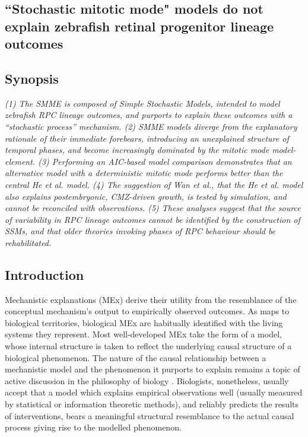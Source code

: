 \documentclass{ut-thesis}
\begin{document}
\begin{NoHyper}
\chapter{``Stochastic mitotic mode" models do not explain zebrafish retinal progenitor lineage outcomes}
\label{chap:SMME}

\section*{Synopsis}
\textit{(1) The SMME is composed of Simple Stochastic Models, intended to model zebrafish RPC lineage outcomes, and purports to explain these outcomes with a ``stochastic process'' mechanism. (2) SMME models diverge from the explanatory rationale of their immediate forebears, introducing an unexplained structure of temporal phases, and become increasingly dominated by the mitotic mode model-element. (3) Performing an AIC-based model comparison demonstrates that an alternative model with a deterministic mitotic mode performs better than the central He et al. model. (4) The suggestion of Wan et al., that the He et al. model also explains postembryonic, CMZ-driven growth, is tested by simulation, and cannot be reconciled with observations. (5) These analyses suggest that the source of variability in RPC lineage outcomes cannot be identified by the construction of SSMs, and that older theories invoking phases of RPC behaviour should be rehabilitated.}

\section{Introduction}

Mechanistic explanations (MEx) derive their utility from the resemblance of the conceptual mechanism's output to empirically observed outcomes. As maps to biological territories, biological MEx are habitually identified with the living systems they represent. Most well-developed MEx take the form of a model, whose internal structure is taken to reflect the underlying causal structure of a biological phenomenon. The nature of the causal relationship between a mechanistic model and the phenomenon it purports to explain remains a topic of active discussion in the philosophy of biology \cite{Fagan2015}. Biologists, nonetheless, usually accept that a model which explains empirical observations well (usually measured by statistical or information theoretic methods), and reliably predicts the results of interventions, bears a meaningful structural resemblance to the actual causal process giving rise to the modelled phenomenon.


\end{NoHyper}
\end{document}
